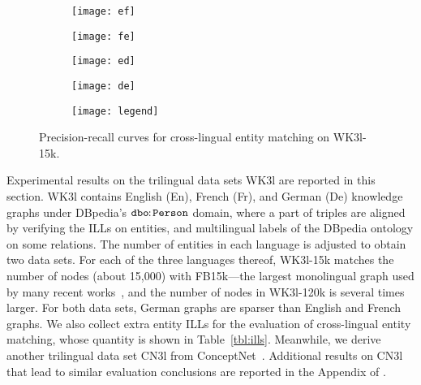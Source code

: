 \documentclass{article}
\begin{document}
\begin{figure*}[t]
\centering
\begin{subfigure}[c]{0.235\textwidth}
\centering
\texttt{[image: ef]}
\end{subfigure}
\hspace{-0.55em}
\begin{subfigure}[c]{0.235\textwidth}
\centering
\texttt{[image: fe]}
\end{subfigure}
\hspace{-0.55em}
\begin{subfigure}[c]{0.235\textwidth}
\centering
\texttt{[image: ed]}
\end{subfigure}
\hspace{-0.55em}
\begin{subfigure}[c]{0.235\textwidth}
\centering
\texttt{[image: de]}
\end{subfigure}
\hspace{-0.55em}
\begin{subfigure}[c]{0.06\textwidth}
\centering
\texttt{[image: legend]}
\end{subfigure}
\vspace{-1em}
\caption{Precision-recall curves for cross-lingual entity matching on WK3l-15k.}
\label{fig:matching}
\vspace{-1.5em}
\end{figure*}



 Experimental results on the trilingual data sets WK3l are reported in this section. WK3l contains English (En), French (Fr), and German (De) knowledge graphs under DBpedia's ${\tt dbo\!\!:\!Person}$ domain, where a part of triples are aligned by verifying the ILLs on entities, and multilingual labels of the DBpedia ontology on some relations. The number of entities in each language is adjusted to obtain two data sets.
For each of the three languages thereof, WK3l-15k matches the number of nodes (about 15,000)
with FB15k---the largest monolingual graph used by many recent works~\cite{zhong2015aligning,lin2015learning,ji2015knowledge,jia2016locally}, and the number of nodes in WK3l-120k is several times larger.
For both data sets, German graphs are sparser than English and French graphs.
We also collect extra entity ILLs for the evaluation of cross-lingual entity matching, whose quantity is shown in Table~\ref{tbl:ills}.
Meanwhile, we derive another trilingual data set CN3l from ConceptNet~\cite{speer2013conceptnet}. Additional results on CN3l that lead to similar evaluation conclusions are reported in the Appendix of \cite{chen2016arxiv}.
\end{document}
